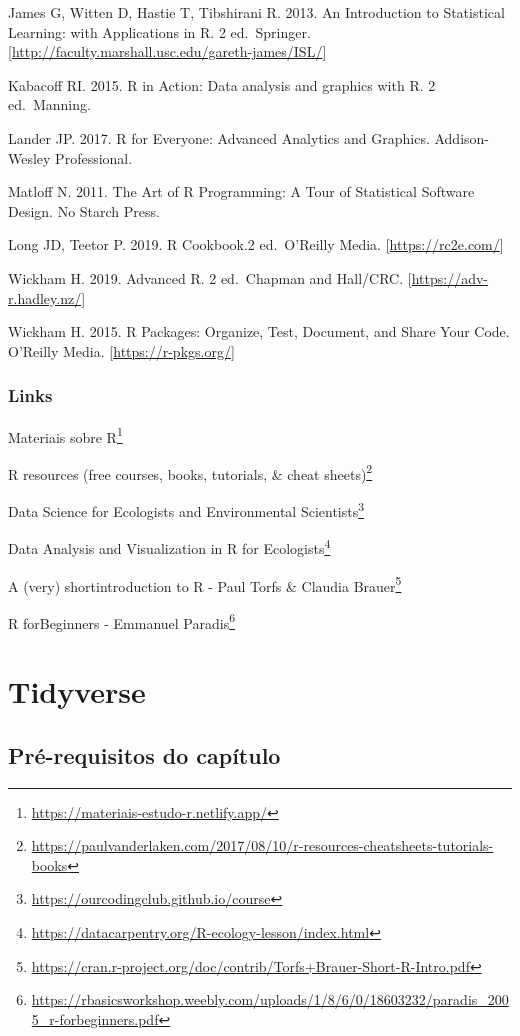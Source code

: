 \documentclass[
]{book}
\renewcommand{\href}[2]{#2\footnote{\url{#1}}}
\begin{document}
James G, Witten D, Hastie T, Tibshirani R. 2013. An Introduction to Statistical Learning: with Applications in R. 2 ed.~Springer. {[}\url{http://faculty.marshall.usc.edu/gareth-james/ISL/}{]}

Kabacoff RI. 2015. R in Action: Data analysis and graphics with R. 2 ed.~Manning.

Lander JP. 2017. R for Everyone: Advanced Analytics and Graphics. Addison-Wesley Professional.

Matloff N. 2011. The Art of R Programming: A Tour of Statistical Software Design. No Starch Press.

Long JD, Teetor P. 2019. R Cookbook.2 ed.~O'Reilly Media. {[}\url{https://rc2e.com/}{]}

Wickham H. 2019. Advanced R. 2 ed.~Chapman and Hall/CRC. {[}\url{https://adv-r.hadley.nz/}{]}

Wickham H. 2015. R Packages: Organize, Test, Document, and Share Your Code. O'Reilly Media. {[}\url{https://r-pkgs.org/}{]}

\hypertarget{links}{%
\subsection{Links}\label{links}}

\href{https://materiais-estudo-r.netlify.app/}{Materiais sobre R}

\href{https://paulvanderlaken.com/2017/08/10/r-resources-cheatsheets-tutorials-books}{R resources (free courses, books, tutorials, \& cheat sheets)}

\href{https://ourcodingclub.github.io/course}{Data Science for Ecologists and Environmental Scientists}

\href{https://datacarpentry.org/R-ecology-lesson/index.html}{Data Analysis and Visualization in R for Ecologists}

\href{https://cran.r-project.org/doc/contrib/Torfs+Brauer-Short-R-Intro.pdf}{A (very) shortintroduction to R - Paul Torfs \& Claudia Brauer}

\href{https://rbasicsworkshop.weebly.com/uploads/1/8/6/0/18603232/paradis_2005_r-forbeginners.pdf}{R forBeginners - Emmanuel Paradis}

\hypertarget{cap5}{%
\chapter{Tidyverse}\label{cap5}}

\hypertarget{pruxe9-requisitos-do-capuxedtulo-1}{%
\section*{Pré-requisitos do capítulo}\label{pruxe9-requisitos-do-capuxedtulo-1}}
\end{document}
